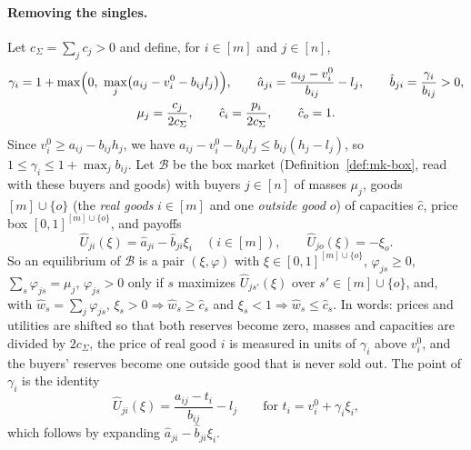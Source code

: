 \paragraph{Removing the singles.} Let $c_\Sigma=\sum_jc_j>0$ and define, for $i\in[m]$ and $j\in[n]$,
\begin{gather*}
\gamma_i=1+\max\Bigl(0,\ \max_{j}\bigl(a_{ij}-v_i^0-b_{ij}l_j\bigr)\Bigr),\qquad
\hat a_{ji}=\frac{a_{ij}-v_i^0}{b_{ij}}-l_j,\qquad \hat b_{ji}=\frac{\gamma_i}{b_{ij}}>0,\\
\mu_j=\frac{c_j}{2c_\Sigma},\qquad \hat c_i=\frac{p_i}{2c_\Sigma},\qquad \hat c_o=1 .
\end{gather*}
Since $v_i^0\ge a_{ij}-b_{ij}h_j$, we have $a_{ij}-v_i^0-b_{ij}l_j\le b_{ij}(h_j-l_j)$, so
$1\le\gamma_i\le1+\max_jb_{ij}$. Let $\mathcal B$ be the box market (Definition~\ref{def:mk-box}, read
with these buyers and goods) with buyers $j\in[n]$ of masses $\mu_j$, goods $[m]\cup\{o\}$ (the
\emph{real goods} $i\in[m]$ and one \emph{outside good} $o$) of capacities $\hat c$, price box
$[0,1]^{[m]\cup\{o\}}$, and payoffs
\[
\hat U_{ji}(\xi)=\hat a_{ji}-\hat b_{ji}\xi_i\quad(i\in[m]),\qquad \hat U_{jo}(\xi)=-\xi_o .
\]
So an equilibrium of $\mathcal B$ is a pair $(\xi,\varphi)$ with $\xi\in[0,1]^{[m]\cup\{o\}}$,
$\varphi_{js}\ge0$, $\sum_s\varphi_{js}=\mu_j$, $\varphi_{js}>0$ only if $s$ maximizes $\hat U_{js'}(\xi)$
over $s'\in[m]\cup\{o\}$, and, with $\hat w_s=\sum_j\varphi_{js}$,
$\xi_s>0\Rightarrow\hat w_s\ge\hat c_s$ and $\xi_s<1\Rightarrow\hat w_s\le\hat c_s$. In words: prices
and utilities are shifted so that both reserves become zero, masses and capacities are divided by
$2c_\Sigma$, the price of real good $i$ is measured in units of $\gamma_i$ above $v_i^0$, and the
buyers' reserves become one outside good that is never sold out. The point of $\gamma_i$ is the
identity
\begin{equation}\label{eq:sxm-shift}
\hat U_{ji}(\xi)=\frac{a_{ij}-t_i}{b_{ij}}-l_j\qquad\text{for }t_i=v_i^0+\gamma_i\xi_i ,
\end{equation}
which follows by expanding $\hat a_{ji}-\hat b_{ji}\xi_i$.

